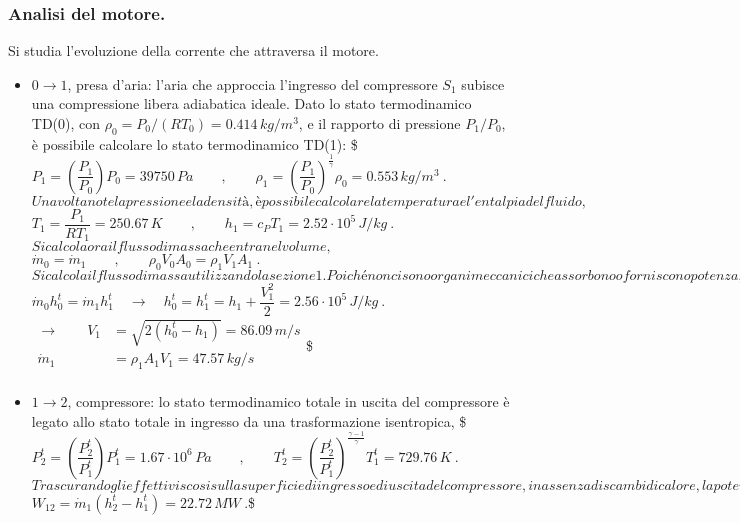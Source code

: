 \documentclass[letterpaper,10pt,italian]{jupyterBook}
\begin{document}
\subsubsection{Analisi del motore.}
\label{\detokenize{polimi/fluidmechanics-ita/template/capitoli/04_bilanci/04e03in:analisi-del-motore}}
\sphinxAtStartPar
Si studia l’evoluzione della corrente che attraversa il motore.
\begin{itemize}
\item {} 
\sphinxAtStartPar
\(0 \rightarrow 1\), presa d’aria: l’aria che approccia l’ingresso del
compressore \(S_1\) subisce una compressione libera adiabatica ideale.
Dato lo stato termodinamico TD(0), con
\(\rho_0 = P_0/ (R T_0) = 0.414 \, kg/m^3\), e il rapporto di
pressione \(P_1 / P_0\), è possibile calcolare lo stato termodinamico
TD(1):
\$\(P_1 = \left( \dfrac{P_1}{P_0} \right) P_0 = 39750 \, Pa \qquad , \qquad
\rho_1 = \left( \dfrac{P_1}{P_0} \right)^{\frac{1}{\gamma}} \rho_0 = 0.553 \, kg/m^3 \ .\)\(
Una volta note la pressione e la densità, è possibile calcolare la
temperatura e l'entalpia del fluido,
\)\(T_1 = \dfrac{P_1}{R T_1} = 250.67 \, K \qquad , \qquad h_1 = c_P T_1 = 2.52 \cdot 10^5 \, J/kg \ .\)\(
Si calcola ora il flusso di massa che entra nel volume,
\)\(\dot{m}_0 = \dot{m}_1 \qquad , \qquad \rho_0 V_0 A_0 = \rho_1 V_1 A_1 \ .\)\(
Si calcola il flusso di massa utilizzando la sezione 1. Poiché non
ci sono organi meccanici che assorbono o forniscono potenza, non ci
sono sorgenti di calore e possono essere trascurati gli effetti
viscosi, tra le sezioni 0 e 1 si conserva il flusso di entalpia
totale, \)\(\dot{m}_0 h_0^t = \dot{m}_1 h_1^t 
  \quad \rightarrow \quad h_0^t = h_1^t = h_1 + \dfrac{V_1^2}{2} = 2.56 \cdot 10^5 \, J/kg \ .\)\(
\)\(\begin{aligned}
 \rightarrow \qquad V_1 & = \sqrt{2(h_0^t - h_1)} = 86.09 \, m/s \\
 \dot{m}_1 & = \rho_1 A_1 V_1 = 47.57 \, kg/s \\
\end{aligned}\)\$

\item {} 
\sphinxAtStartPar
\(1 \rightarrow 2\), compressore: lo stato termodinamico totale in
uscita del compressore è legato allo stato totale in ingresso da una
trasformazione isentropica,
\$\(P_2^t = \left( \dfrac{P_2^t}{P_1^t} \right) P_1^t = 1.67 \cdot 10^6 \, Pa \qquad , \qquad
   T_2^t = \left( \dfrac{P_2^t}{P_1^t} \right)^{\frac{\gamma-1}{\gamma}} T_1^t = 729.76 \, K \ .\)\(
Trascurando gli effetti viscosi sulla superficie di ingresso e di
uscita del compressore, in assenza di scambi di calore, la potenza
fornita dal compressore al fluido vale
\)\(W_{12} = \dot{m}_1 ( h_2^t - h_1^t ) = 22.72 \, MW \ .\)\$


\end{itemize}
\end{document}
